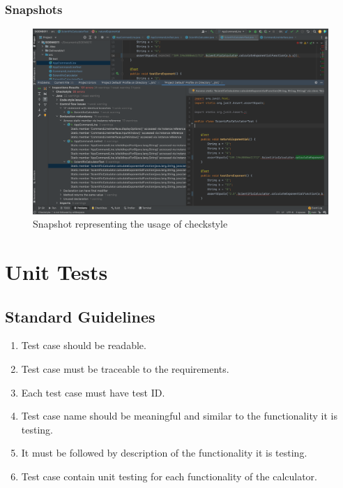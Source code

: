 \documentclass[a4paper,12pt]{report}
\begin{document}
\subsubsection{Snapshots}
\pagebreak
\begin{figure}
\includegraphics[width=15cm]{Checkstyle.png}
\caption{Snapshot representing the usage of checkstyle}
\label{exp}
\end{figure}


\section{Unit Tests}
\subsection{Standard Guidelines}
\begin{enumerate}
    \item Test case should be readable.
    \item Test case must be traceable to the requirements.
    \item Each test case must have test ID.
    \item Test case name should be meaningful and similar to the functionality it is testing.
    \item It must be followed by description of the functionality it is testing.
    \item Test case contain unit testing for each functionality of the calculator.

\end{enumerate}
\end{document}
